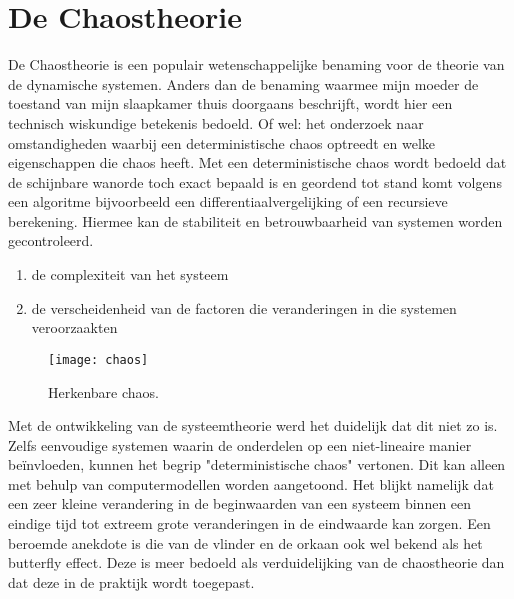 \documentclass[11pt,fleqn]{book} %
\begin{document}
\section{De Chaostheorie}
De Chaostheorie is een populair wetenschappelijke benaming voor de theorie van de dynamische systemen. Anders dan de benaming waarmee mijn moeder de toestand van mijn slaapkamer thuis doorgaans beschrijft, wordt hier een technisch wiskundige betekenis bedoeld. Of wel: het onderzoek naar omstandigheden waarbij een deterministische chaos optreedt en welke eigenschappen die chaos heeft. Met een deterministische chaos wordt bedoeld dat de schijnbare wanorde toch exact bepaald is en geordend tot stand komt volgens een algoritme bijvoorbeeld een differentiaalvergelijking of een recursieve berekening. Hiermee kan de stabiliteit en betrouwbaarheid van systemen worden gecontroleerd.
\begin{enumerate}
\item de complexiteit van het systeem
\item de verscheidenheid van de factoren die veranderingen in die systemen veroorzaakten 
\end{enumerate}
\begin{figure}[h]
	\centering\texttt{[image: chaos]}
	\caption{Herkenbare chaos.}
	\label{fig:chaos}
\end{figure}
Met de ontwikkeling van de systeemtheorie werd het duidelijk dat dit niet zo is. Zelfs eenvoudige systemen waarin de onderdelen op een niet-lineaire manier beïnvloeden, kunnen het begrip "deterministische chaos" vertonen. Dit kan alleen met behulp van computermodellen worden aangetoond. Het blijkt namelijk dat een zeer kleine verandering in de beginwaarden van een systeem binnen een eindige tijd tot extreem grote veranderingen in de eindwaarde kan zorgen. Een beroemde anekdote is die van de vlinder en de orkaan ook wel bekend als het butterfly effect. Deze is meer bedoeld als verduidelijking van de chaostheorie dan dat deze in de praktijk wordt toegepast.
\end{document}
